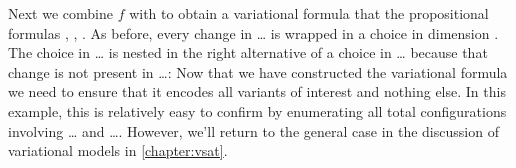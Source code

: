 Next we combine $f$ with \qV{} to obtain a variational formula that the
propositional formulas \pV{}, \qV{}, \rV{}. As before, every change
in \ldots{} is wrapped in a choice in dimension \dimQ. The choice in \ldots{} is
nested in the right alternative of a choice in \ldots{} because that change is not
present in \ldots{}:
%
%
Now that we have constructed the variational formula we need to ensure that it
encodes all variants of interest and nothing else. In this example, this is
relatively easy to confirm by enumerating all total configurations involving
\ldots{} and \ldots{}. However, we'll return to the general case in the discussion
of variational models in \autoref{chapter:vsat}.


